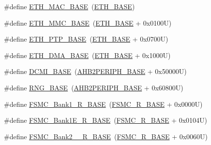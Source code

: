 \begin{DoxyCompactItemize}
\item 
\#define \hyperlink{group___peripheral__registers__structures_ga3cf7005808feb61bff1fee01e50a711a}{E\+T\+H\+\_\+\+M\+A\+C\+\_\+\+B\+A\+SE}~(\hyperlink{group___peripheral__memory__map_gad965a7b1106ece575ed3da10c45c65cc}{E\+T\+H\+\_\+\+B\+A\+SE})
\item 
\#define \hyperlink{group___peripheral__registers__structures_ga4946f2b3b03f7998343ac1778fbcf725}{E\+T\+H\+\_\+\+M\+M\+C\+\_\+\+B\+A\+SE}~(\hyperlink{group___peripheral__memory__map_gad965a7b1106ece575ed3da10c45c65cc}{E\+T\+H\+\_\+\+B\+A\+SE} + 0x0100\+U)
\item 
\#define \hyperlink{group___peripheral__registers__structures_gaa0f60b922aeb7275c785cbaa8f94ecf0}{E\+T\+H\+\_\+\+P\+T\+P\+\_\+\+B\+A\+SE}~(\hyperlink{group___peripheral__memory__map_gad965a7b1106ece575ed3da10c45c65cc}{E\+T\+H\+\_\+\+B\+A\+SE} + 0x0700\+U)
\item 
\#define \hyperlink{group___peripheral__registers__structures_gace2114e1b37c1ba88d60f3e831b67e93}{E\+T\+H\+\_\+\+D\+M\+A\+\_\+\+B\+A\+SE}~(\hyperlink{group___peripheral__memory__map_gad965a7b1106ece575ed3da10c45c65cc}{E\+T\+H\+\_\+\+B\+A\+SE} + 0x1000\+U)
\item 
\#define \hyperlink{group___peripheral__registers__structures_ga55b794507e021135486de57129a2505c}{D\+C\+M\+I\+\_\+\+B\+A\+SE}~(\hyperlink{group___peripheral__memory__map_gaeedaa71d22a1948492365e2cd26cfd46}{A\+H\+B2\+P\+E\+R\+I\+P\+H\+\_\+\+B\+A\+SE} + 0x50000\+U)
\item 
\#define \hyperlink{group___peripheral__registers__structures_gab92662976cfe62457141e5b4f83d541c}{R\+N\+G\+\_\+\+B\+A\+SE}~(\hyperlink{group___peripheral__memory__map_gaeedaa71d22a1948492365e2cd26cfd46}{A\+H\+B2\+P\+E\+R\+I\+P\+H\+\_\+\+B\+A\+SE} + 0x60800\+U)
\item 
\#define \hyperlink{group___peripheral__registers__structures_gad196fe6f5e4041b201d14f43508c06d2}{F\+S\+M\+C\+\_\+\+Bank1\+\_\+\+R\+\_\+\+B\+A\+SE}~(\hyperlink{group___peripheral__registers__structures_gaddf0e199dccba83272b20c9fb4d3aaed}{F\+S\+M\+C\+\_\+\+R\+\_\+\+B\+A\+SE} + 0x0000\+U)
\item 
\#define \hyperlink{group___peripheral__registers__structures_gaea182589c84aee30b7f735474d8774e2}{F\+S\+M\+C\+\_\+\+Bank1\+E\+\_\+\+R\+\_\+\+B\+A\+SE}~(\hyperlink{group___peripheral__registers__structures_gaddf0e199dccba83272b20c9fb4d3aaed}{F\+S\+M\+C\+\_\+\+R\+\_\+\+B\+A\+SE} + 0x0104\+U)
\item 
\#define \hyperlink{group___peripheral__registers__structures_ga851707a200f63e03c336073706fdce1d}{F\+S\+M\+C\+\_\+\+Bank2\+\_\+\_\+\+R\+\_\+\+B\+A\+SE}~(\hyperlink{group___peripheral__registers__structures_gaddf0e199dccba83272b20c9fb4d3aaed}{F\+S\+M\+C\+\_\+\+R\+\_\+\+B\+A\+SE} + 0x0060\+U)

\end{DoxyCompactItemize}
